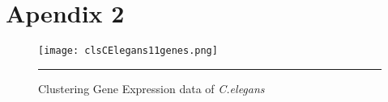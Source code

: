 
\chapter{Apendix 2}

\ifpdf
    \graphicspath{{Appendix2/Figs/Raster/}{Appendix2/Figs/PDF/}{Appendix2/Figs/}}
\else
    \graphicspath{{Appendix2/Figs/Vector/}{Appendix2/Figs/}}
\fi

\begin{figure}
	\centering
		\texttt{[image: clsCElegans11genes.png]}
		\rule{35em}{0.5pt}
	\caption[Clustering Gene Expression dataof \textit{C.elegans}]
		{Clustering Gene Expression data of \textit{C.elegans}}
	\label{fig:clsCelegans}
\end{figure}
